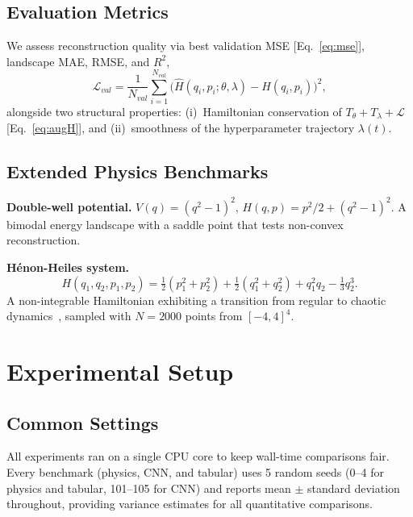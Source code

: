 \documentclass[11pt]{article}
\theoremstyle{definition}
\begin{document}
\subsection{Evaluation Metrics}

We assess reconstruction quality via best validation MSE
[Eq.~\eqref{eq:mse}], landscape MAE, RMSE, and $R^2$,
\begin{equation}
\mathcal{L}_{val}
= \frac{1}{N_{val}}\sum_{i=1}^{N_{val}}
  \bigl(\hat{H}(q_i,p_i;\theta,\lambda) - H(q_i,p_i)\bigr)^2,
\label{eq:mse}
\end{equation}
alongside two structural properties: (i)~Hamiltonian conservation of
$T_\theta+T_\lambda+\mathcal{L}$ [Eq.~\eqref{eq:augH}], and
(ii)~smoothness of the hyperparameter trajectory $\lambda(t)$.

\subsection{Extended Physics Benchmarks}

\textbf{Double-well potential.}
$V(q)=(q^2-1)^2$, $H(q,p)=p^2/2+(q^2-1)^2$. A bimodal energy
landscape with a saddle point that tests non-convex reconstruction.

\textbf{H\'{e}non-Heiles system.}
\begin{equation*}
H(q_1,q_2,p_1,p_2) = \tfrac{1}{2}(p_1^2+p_2^2)
 + \tfrac{1}{2}(q_1^2+q_2^2) + q_1^2 q_2 - \tfrac{1}{3}q_2^3.
\end{equation*}
A non-integrable Hamiltonian exhibiting a transition from regular to
chaotic dynamics~\cite{henon1964,offen2022learning}, sampled with
$N=2000$ points from $[-4,4]^4$.


\section{Experimental Setup}
\label{sec:setup}

\subsection{Common Settings}

All experiments ran on a single CPU core to keep wall-time
comparisons fair. Every benchmark (physics, CNN, and tabular) uses
5 random seeds (0--4 for physics and tabular, 101--105 for CNN) and
reports mean $\pm$ standard deviation throughout, providing variance
estimates for all quantitative comparisons.
\end{document}
